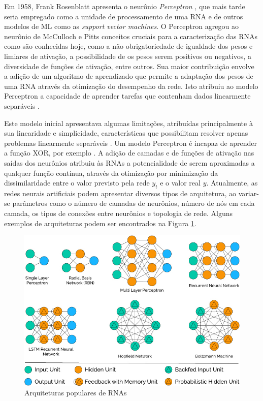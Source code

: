 Em 1958, Frank Rosenblatt apresenta o neurônio \emph{Perceptron} \cite{rosenblatt1958perceptron}, que mais tarde seria empregado como a unidade de processamento de uma RNA e de outros modelos de ML como as \emph{support vector machines}. O Perceptron agregou ao neurônio de McCulloch e Pitts conceitos cruciais para a caracterização das RNAs como são conhecidas hoje, como a não obrigatoriedade de igualdade dos pesos e limiares de ativação, a possibilidade de os pesos serem positivos ou negativos, a diversidade de funções de ativação, entre outros. Sua maior contribuição envolve a adição de um algoritmo de aprendizado que permite a adaptação dos pesos de uma RNA através da otimização do desempenho da rede. Isto atribuiu ao modelo Perceptron a capacidade de aprender tarefas que contenham dados linearmente separáveis \cite{braga2000redes}.

Este modelo inicial apresentava algumas limitações, atribuídas principalmente à sua linearidade e simplicidade, características que possibilitam resolver apenas problemas linearmente separáveis \cite{braga2000redes}. Um modelo Perceptron é incapaz de aprender a função XOR, por exemplo \cite{goodfellow2016deep}. A adição de camadas e de funções de ativação nas saídas dos neurônios atribuiu às RNAs a potencialidade de serem aproximadas a qualquer função contínua, através da otimização por minimização da dissimilaridade entre o valor previsto pela rede $y_t$ e o valor real $y$. Atualmente, as redes neurais artificiais podem apresentar diversos tipos de arquitetura, ao variar-se parâmetros como o número de camadas de neurônios, número de nós em cada camada, os tipos de conexões entre neurônios e topologia de rede. Alguns exemplos de arquiteturas podem ser encontrados na Figura \ref{fig:popular_archs}.

\begin{figure}[!h]
	\includegraphics[width=\linewidth]{img/popular_archs}
	\caption{Arquiteturas populares de RNAs}
	\label{fig:popular_archs}
\end{figure}

